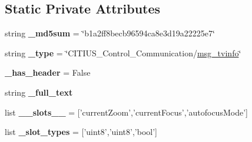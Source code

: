 \subsection*{\-Static \-Private \-Attributes}
\begin{DoxyCompactItemize}
\item 
\hypertarget{class_c_i_t_i_u_s___control___communication_1_1msg_1_1__msg__tvinfo_1_1msg__tvinfo_ac7b22fc3cdef1ff2d8aec8492ba39868}{string {\bfseries \-\_\-md5sum} = \char`\"{}b1a2ff8becb96594ca8e3d19a22225e7\char`\"{}}\label{class_c_i_t_i_u_s___control___communication_1_1msg_1_1__msg__tvinfo_1_1msg__tvinfo_ac7b22fc3cdef1ff2d8aec8492ba39868}

\item 
\hypertarget{class_c_i_t_i_u_s___control___communication_1_1msg_1_1__msg__tvinfo_1_1msg__tvinfo_ad5fa6c9c449abefb4e6eed4d143a898a}{string {\bfseries \-\_\-type} = \char`\"{}\-C\-I\-T\-I\-U\-S\-\_\-\-Control\-\_\-\-Communication/\hyperlink{class_c_i_t_i_u_s___control___communication_1_1msg_1_1__msg__tvinfo_1_1msg__tvinfo}{msg\-\_\-tvinfo}\char`\"{}}\label{class_c_i_t_i_u_s___control___communication_1_1msg_1_1__msg__tvinfo_1_1msg__tvinfo_ad5fa6c9c449abefb4e6eed4d143a898a}

\item 
\hypertarget{class_c_i_t_i_u_s___control___communication_1_1msg_1_1__msg__tvinfo_1_1msg__tvinfo_ad5a7f6374caa16b854ce78dfa26ea52a}{{\bfseries \-\_\-has\-\_\-header} = \-False}\label{class_c_i_t_i_u_s___control___communication_1_1msg_1_1__msg__tvinfo_1_1msg__tvinfo_ad5a7f6374caa16b854ce78dfa26ea52a}

\item 
string {\bfseries \-\_\-full\-\_\-text}
\item 
\hypertarget{class_c_i_t_i_u_s___control___communication_1_1msg_1_1__msg__tvinfo_1_1msg__tvinfo_a0e6f76f52792e5e2d020d99a943032c3}{list {\bfseries \-\_\-\-\_\-slots\-\_\-\-\_\-} = \mbox{[}'current\-Zoom','current\-Focus','autofocus\-Mode'\mbox{]}}\label{class_c_i_t_i_u_s___control___communication_1_1msg_1_1__msg__tvinfo_1_1msg__tvinfo_a0e6f76f52792e5e2d020d99a943032c3}

\item 
\hypertarget{class_c_i_t_i_u_s___control___communication_1_1msg_1_1__msg__tvinfo_1_1msg__tvinfo_a883e903943805f1411959c479d025e50}{list {\bfseries \-\_\-slot\-\_\-types} = \mbox{[}'uint8','uint8','bool'\mbox{]}}\label{class_c_i_t_i_u_s___control___communication_1_1msg_1_1__msg__tvinfo_1_1msg__tvinfo_a883e903943805f1411959c479d025e50}

\end{DoxyCompactItemize}


